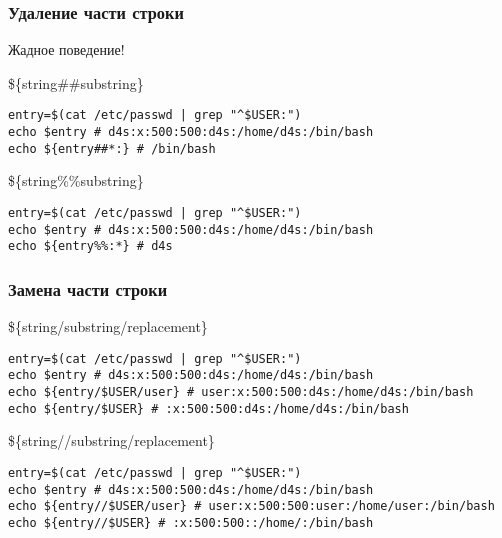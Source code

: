 \begin{frame}[fragile]
	\frametitle{Удаление части строки}

	\large{Жадное поведение!}

	\begin{block}{\$\{string\#\#substring\}}
	\begin{lstlisting}
entry=$(cat /etc/passwd | grep "^$USER:")
echo $entry # d4s:x:500:500:d4s:/home/d4s:/bin/bash
echo ${entry##*:} # /bin/bash
\end{lstlisting}
	\end{block}
	\pause
	\begin{block}{\$\{string\%\%substring\}}
	\begin{lstlisting}
entry=$(cat /etc/passwd | grep "^$USER:")
echo $entry # d4s:x:500:500:d4s:/home/d4s:/bin/bash
echo ${entry%%:*} # d4s
\end{lstlisting}
	\end{block}
\end{frame}


\begin{frame}[fragile]
	\frametitle{Замена части строки}

	\begin{block}{\$\{string/substring/replacement\}}
	\begin{lstlisting}
entry=$(cat /etc/passwd | grep "^$USER:")
echo $entry # d4s:x:500:500:d4s:/home/d4s:/bin/bash
echo ${entry/$USER/user} # user:x:500:500:d4s:/home/d4s:/bin/bash
echo ${entry/$USER} # :x:500:500:d4s:/home/d4s:/bin/bash
\end{lstlisting}
	\end{block}

	\pause
	\begin{block}{\$\{string//substring/replacement\}}
	\begin{lstlisting}
entry=$(cat /etc/passwd | grep "^$USER:")
echo $entry # d4s:x:500:500:d4s:/home/d4s:/bin/bash
echo ${entry//$USER/user} # user:x:500:500:user:/home/user:/bin/bash
echo ${entry//$USER} # :x:500:500::/home/:/bin/bash
\end{lstlisting}
	\end{block}

\end{frame}

